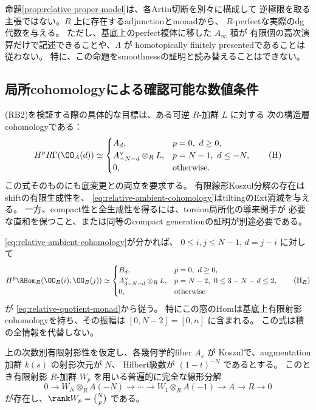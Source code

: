 \begin{remark}[有限性の範囲]\label{rem:relative-model-finiteness}
 命題\ref{prop:relative-proper-model}は、各Artin切断を別々に構成して
 逆極限を取る主張ではない。\(R\) 上に存在するadjunctionとmonadから、
 \(R\)-perfectな実際のdg代数を与える。
 ただし、基底上のperfect複体に移した \(A_\infty\) 積が
 有限個の高次演算だけで記述できることや、\(\Lambda\) が
 homotopically finitely presentedであることは従わない。
 特に、この命題をsmoothnessの証明と読み替えることはできない。
\end{remark}

\subsection{局所cohomologyによる確認可能な数値条件}

(RB2)を検証する際の具体的な目標は、ある可逆 \(R\)-加群 \(L\) に対する
次の構造層cohomologyである：
\[
 H^pR\Gamma(\OO_A(d))\simeq
 \begin{cases}
 A_d,&p=0,\ d\ge0,\\
 A_{-N-d}^{\vee}\otimes_RL,&p=N-1,\ d\le-N,\\
 0,&\text{otherwise}.
 \end{cases}
 \tag{H}\label{eq:relative-ambient-cohomology}
\]
この式そのものにも底変更との両立を要求する。
有限線形Koszul分解の存在はshiftの有限生成性を、
\eqref{eq:relative-ambient-cohomology}はtiltingのExt消滅を与える。
一方、compact性と全生成性を得るには、torsion局所化の導来関手が
必要な直和を保つこと、または同等のcompact generationの証明が別途必要である。

\eqref{eq:relative-ambient-cohomology}が分かれば、
\(0\le i,j\le N-1\), \(d=j-i\) に対して
\[
 H^p\RHom_B(\OO_B(i),\OO_B(j))\simeq
 \begin{cases}
 B_d,&p=0,\ d\ge0,\\
 A_{3-N-d}^{\vee}\otimes_RL,
     &p=N-2,\ 0\le3-N-d\le2,\\
 0,&\text{otherwise}
 \end{cases}
 \tag{H$_B$}\label{eq:relative-hypersurface-cohomology}
\]
が \eqref{eq:relative-quotient-monad}から従う。
特にこの窓のHomは基底上有限射影cohomologyを持ち、その振幅は
\([0,N-2]=[0,n]\) に含まれる。
この式は積の全情報を代替しない。

\begin{lemma}
\label{lem:relative-koszul-resolution}
 上の次数別有限射影性を仮定し、各幾何学的fiber \(A_s\) が
 Koszulで、augmentation加群 \(k(s)\) の射影次元が \(N\)、
 Hilbert級数が \((1-t)^{-N}\) であるとする。
 このとき有限射影 \(R\)-加群 \(W_p\) を用いる普遍的に完全な線形分解
 \[
 0\to W_N\otimes_RA(-N)\to\cdots\to
 W_1\otimes_RA(-1)\to A\to R\to0
 \tag{K}\label{eq:relative-linear-resolution}
 \]
 が存在し、\(\rank W_p=\binom Np\) である。
\end{lemma}

